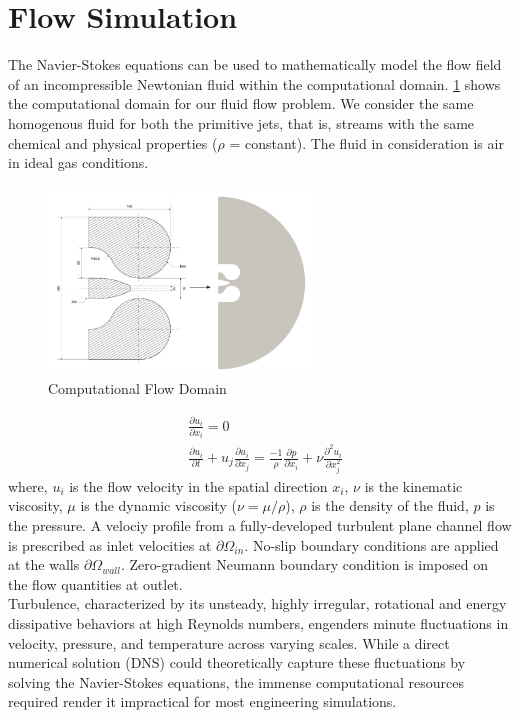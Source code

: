 \section{Flow Simulation}
The Navier-Stokes equations can be used to mathematically model the flow field of an incompressible Newtonian fluid within the computational domain. 
\ref{fig:Domain} shows the computational domain for our fluid flow problem. We consider the same homogenous fluid for both the primitive jets, that is, streams with the same chemical and physical properties ($\rho$ = constant). The fluid in consideration is air in ideal gas conditions. 
\begin{figure}[ht]
  \centering
  \includegraphics[width=7cm]{images/Theory-CFD/Flow Domain.png}
  \caption{Computational Flow Domain}
  \label{fig:Domain}
\end{figure}
\begin{equation}
  \begin{aligned}
  &\frac{\partial u_i}{\partial x_i}=0\\
  &\frac{\partial u_i}{\partial t}+u_j \frac{\partial u_i}{\partial x_j}=\frac{-1}{\rho} \frac{\partial p}{\partial x_i}+\nu \frac{\partial^2 u_i}{\partial x_j^2}
  \end{aligned}
  \end{equation}
where, $u_i$ is the flow velocity in the spatial direction $x_i$, $\nu$ is the kinematic viscosity, $\mu$ is the dynamic viscosity ($\nu = \mu / \rho$), $\rho$ is the density of the fluid, $p$ is the pressure. A velociy profile from a fully-developed turbulent plane channel flow is prescribed as inlet velocities at $\partial{\Omega_{in}}$. No-slip boundary conditions are applied at the walls $\partial{\Omega_{wall}}$. Zero-gradient Neumann boundary condition is imposed on the flow quantities at outlet.\\
Turbulence, characterized by its unsteady, highly irregular, rotational and energy dissipative behaviors at high Reynolds numbers, engenders minute fluctuations in velocity, pressure, and temperature across varying scales. While a direct numerical solution (DNS) could theoretically capture these fluctuations by solving the Navier-Stokes equations, the immense computational resources required render it impractical for most engineering simulations. 
